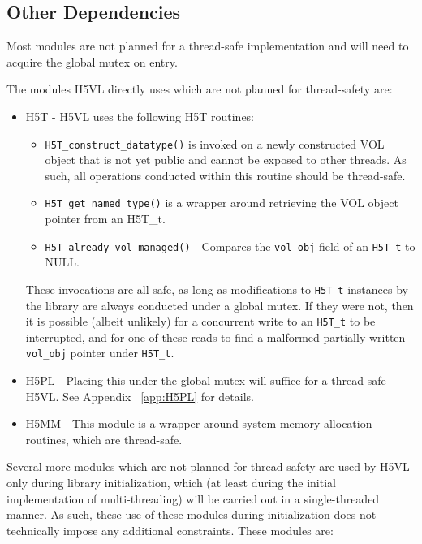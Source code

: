 \documentclass{article}
\begin{document}
\subsection{Other Dependencies}

Most modules are not planned for a thread-safe implementation and will need to acquire the global mutex on entry. 

The modules H5VL directly uses which are not planned for thread-safety are:

\begin{itemize}
    \item H5T - H5VL uses the following H5T routines:

    \begin{itemize}
        \item \texttt{H5T\_construct\_datatype()} is invoked on a newly constructed VOL object that is not yet public and cannot be exposed to other threads. As such, all operations conducted within this routine should be thread-safe.
    
        \item \texttt{H5T\_get\_named\_type()} is a wrapper around retrieving the VOL object pointer from an H5T\_t.
    
        \item \texttt{H5T\_already\_vol\_managed()} - Compares the \texttt{vol\_obj} field of an \texttt{H5T\_t} to NULL.
    
    \end{itemize}

    These invocations are all safe, as long as modifications to \texttt{H5T\_t} instances by the library are always conducted under a global mutex. If they were not, then it is possible (albeit unlikely) for a concurrent write to an \texttt{H5T\_t} to be interrupted, and for one of these reads to find a malformed partially-written \texttt{vol\_obj} pointer under \texttt{H5T\_t}.

    \item H5PL - Placing this under the global mutex will suffice for a thread-safe H5VL. See Appendix ~\ref{app:H5PL} for details.
    
    \item H5MM - This module is a wrapper around system memory allocation routines, which are thread-safe.

\end{itemize}    

Several more modules which are not planned for thread-safety are used by H5VL only during library initialization, which (at least during the initial implementation of multi-threading) will be carried out in a single-threaded manner. As such, these use of these modules during initialization does not technically impose any additional constraints. These modules are:
\end{document}
